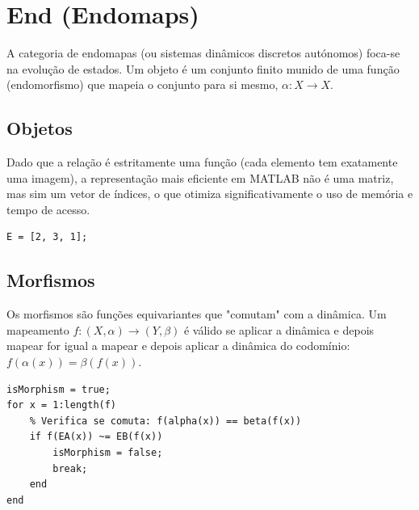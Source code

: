 \section{End (Endomaps)}
A categoria de endomapas (ou sistemas dinâmicos discretos autónomos) foca-se na evolução de estados.
Um objeto é um conjunto finito munido de uma função (endomorfismo) que mapeia o conjunto para si mesmo, $\alpha: X \to X$.

\subsection{Objetos}
Dado que a relação é estritamente uma função (cada elemento tem exatamente uma imagem), a representação mais eficiente em MATLAB não é uma matriz, mas sim um vetor de índices, o que otimiza significativamente o uso de memória e tempo de acesso.

\begin{lstlisting}[caption={Representação de um Endomapa}]
% Vetor representando f(1)=2, f(2)=3, f(3)=1 (Um ciclo de comprimento 3)
E = [2, 3, 1];
\end{lstlisting}

\subsection{Morfismos}
Os morfismos são funções equivariantes que "comutam" com a dinâmica.
Um mapeamento $f: (X, \alpha) \to (Y, \beta)$ é válido se aplicar a dinâmica e depois mapear for igual a mapear e depois aplicar a dinâmica do codomínio: $f(\alpha(x)) = \beta(f(x))$.

\begin{lstlisting}[caption={Verificação do Quadrado Comutativo}]
% f é o morfismo; EA e EB são os endomapas
isMorphism = true;
for x = 1:length(f)
    % Verifica se comuta: f(alpha(x)) == beta(f(x))
    if f(EA(x)) ~= EB(f(x))
        isMorphism = false;
        break;
    end
end
\end{lstlisting}